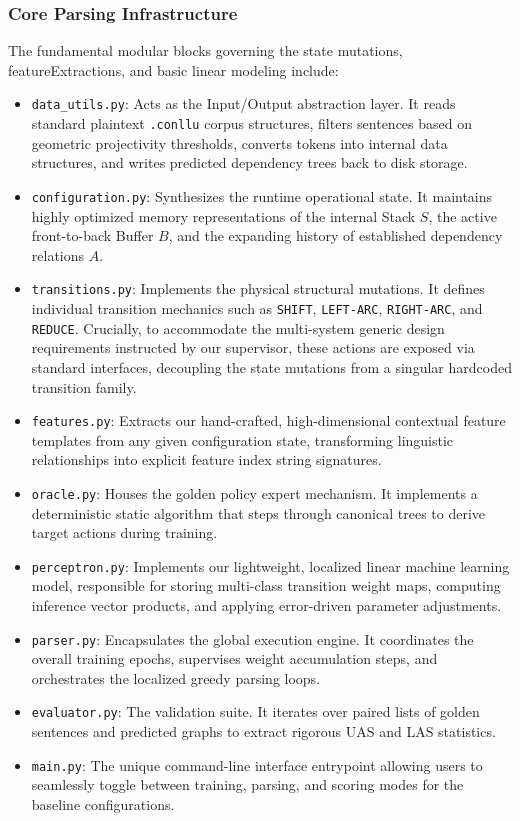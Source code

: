\documentclass[12pt,a4paper]{article}
\begin{document}
\subsubsection{Core Parsing Infrastructure}
The fundamental modular blocks governing the state mutations, featureExtractions, and basic linear modeling include:
\begin{itemize}
    \item \texttt{data\_utils.py}: Acts as the Input/Output abstraction layer. It reads standard plaintext \texttt{.conllu} corpus structures, filters sentences based on geometric projectivity thresholds, converts tokens into internal data structures, and writes predicted dependency trees back to disk storage.
    \item \texttt{configuration.py}: Synthesizes the runtime operational state. It maintains highly optimized memory representations of the internal Stack $S$, the active front-to-back Buffer $B$, and the expanding history of established dependency relations $A$.
    \item \texttt{transitions.py}: Implements the physical structural mutations. It defines individual transition mechanics such as \texttt{SHIFT}, \texttt{LEFT-ARC}, \texttt{RIGHT-ARC}, and \texttt{REDUCE}. Crucially, to accommodate the multi-system generic design requirements instructed by our supervisor, these actions are exposed via standard interfaces, decoupling the state mutations from a singular hardcoded transition family.
    \item \texttt{features.py}: Extracts our hand-crafted, high-dimensional contextual feature templates from any given configuration state, transforming linguistic relationships into explicit feature index string signatures.
    \item \texttt{oracle.py}: Houses the golden policy expert mechanism. It implements a deterministic static algorithm that steps through canonical trees to derive target actions during training.
    \item \texttt{perceptron.py}: Implements our lightweight, localized linear machine learning model, responsible for storing multi-class transition weight maps, computing inference vector products, and applying error-driven parameter adjustments.
    \item \texttt{parser.py}: Encapsulates the global execution engine. It coordinates the overall training epochs, supervises weight accumulation steps, and orchestrates the localized greedy parsing loops.
    \item \texttt{evaluator.py}: The validation suite. It iterates over paired lists of golden sentences and predicted graphs to extract rigorous UAS and LAS statistics.
    \item \texttt{main.py}: The unique command-line interface entrypoint allowing users to seamlessly toggle between training, parsing, and scoring modes for the baseline configurations.
\end{itemize}
\end{document}
